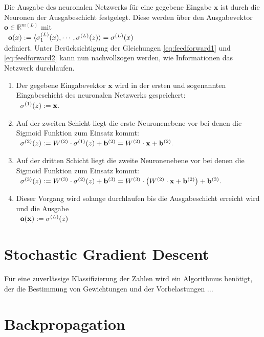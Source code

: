 Die Ausgabe des neuronalen Netzwerks für eine gegebene Eingabe $\mathbf{x}$ ist durch die Neuronen der Ausgabeschicht festgelegt. Diese werden über den Ausgabevektor $\mathbf{o} \in \mathbb{R}^{m(L)}$ mit \\[0.2cm]
\hspace*{1.3cm}
$
\begin{array}[t]{lclll}
	\mathbf{o}(x) := \langle \sigma_1^{(L)}(x),\cdots ,\sigma^{(L)}(z)\rangle = \sigma^{(L)}(x)
\end{array}
$
\\[0.2cm]
definiert. Unter Berücksichtigung der Gleichungen \ref{eq:feedforward1} und \ref{eq:feedforward2} kann nun nachvollzogen werden, wie Informationen das Netzwerk durchlaufen.
\begin{enumerate}
	\item  Der gegebene Eingabevektor $\mathbf{x}$ wird in der ersten und sogenannten Eingabeschicht des neuronalen Netzwerks gespeichert: \\[0.2cm]
\hspace*{1.3cm}
$
\begin{array}[t]{lclll}
	\sigma^{(1)}(z) := \mathbf{x}.
\end{array}
$
	\item Auf der zweiten Schicht liegt die erste Neuronenebene vor bei denen die Sigmoid Funktion zum Einsatz kommt: \\[0.2cm]
\hspace*{1.3cm}
$
\begin{array}[t]{lclll}
	\sigma^{(2)}(z) := W^{(2)}\cdot \sigma^{(1)}(z)+\mathbf{b}^{(2)} = W^{(2)}\cdot \mathbf{x}+\mathbf{b}^{(2)}.
\end{array}
$
\item Auf der dritten Schicht liegt die zweite Neuronenebene vor bei denen die Sigmoid Funktion zum Einsatz kommt: \\[0.2cm]
\hspace*{1.3cm}
$
\begin{array}[t]{lclll}
	\sigma^{(3)}(z) := W^{(3)}\cdot \sigma^{(2)}(z)+\mathbf{b}^{(3)} = W^{(3)}\cdot \left(W^{(2)}\cdot \mathbf{x}+\mathbf{b}^{(2)}\right)+\mathbf{b}^{(3)}.
\end{array}
$
\item Dieser Vorgang wird solange durchlaufen bis die Ausgabeschicht erreicht wird und die Ausgabe \\[0.2cm]
\hspace*{1.3cm}
$
\begin{array}[t]{lclll}
	\mathbf{o}(\mathbf{x}) := \sigma^{(L)}(z)
\end{array}
$
\end{enumerate}

\section{Stochastic Gradient Descent}
Für eine zuverlässige Klassifizierung der Zahlen wird ein Algorithmus benötigt, der die Bestimmung von Gewichtungen und der Vorbelastungen ...

\section{Backpropagation}

